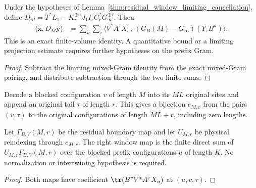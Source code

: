 \begin{lemma}
    \label{thm:residual_window_centered_gram_error}
    \leanok
    Under the hypotheses of Lemma~\ref{thm:residual_window_limiting_cancellation},
    define
    $D_M=T^*L_1-K_r^{\oplus u}J_1I_rC_r^*G_\infty^{\oplus\tau}$.
    Then
    \begin{align}
        \langle\mathbf x,D_M\mathbf y\rangle
         & =\sum_u\sum_\tau
        \big\langle V^*A^\tau X_u,\,
        (G_B(M)-G_\infty)(Y_\tau B^u)\big\rangle.
        \label{eq:ph_residual_centered_gram}
    \end{align}
    This is an exact finite-volume identity. A quantitative bound or a limiting
    projection estimate requires further hypotheses on the prefix Gram.
\end{lemma}
\begin{proof}\leanok
    Subtract the limiting mixed-Gram identity from the exact mixed-Gram
    pairing, and distribute subtraction through the two finite sums.
\end{proof}

\begin{definition}
    \label{def:residual_boundary_config_equiv}
    \leanok
    Decode a blocked configuration $v$ of length $M$ into its $ML$ original
    sites and append an original tail $\tau$ of length $r$. This gives a
    bijection $e_{M,r}$ from the pairs $(v,\tau)$ to the original configurations
    of length $ML+r$, including zero lengths.
\end{definition}

\begin{lemma}
    \label{thm:residual_window_right_fiberwise}
    \leanok
    Let $\Gamma_{B,V}(M,r)$ be the residual boundary map and let $U_{M,r}$
    be physical reindexing through $e_{M,r}$. The right window map is the
    finite direct sum of $U_{M,r}\Gamma_{B,V}(M,r)$ over the blocked prefix
    configurations $u$ of length $K$.
    No normalization or intertwining hypothesis is required.
\end{lemma}
\begin{proof}\leanok
    Both maps have coefficient $\tr(B^vV^*A^\tau X_u)$ at $(u,v,\tau)$.
\end{proof}


